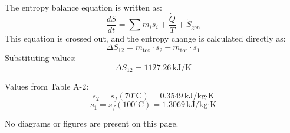 The entropy balance equation is written as:  
\[
\frac{dS}{dt} = \sum \dot{m}_i s_i + \frac{\dot{Q}}{T} + \dot{S}_{\text{gen}}
\]  
This equation is crossed out, and the entropy change is calculated directly as:  
\[
\Delta S_{12} = m_{\text{tot}} \cdot s_2 - m_{\text{tot}} \cdot s_1
\]  
Substituting values:  
\[
\Delta S_{12} = 1127.26 \, \text{kJ/K}
\]  

Values from Table A-2:  
\[
s_2 = s_f(70^\circ\text{C}) = 0.3549 \, \text{kJ/kg·K}
\]  
\[
s_1 = s_f(100^\circ\text{C}) = 1.3069 \, \text{kJ/kg·K}
\]  

No diagrams or figures are present on this page.